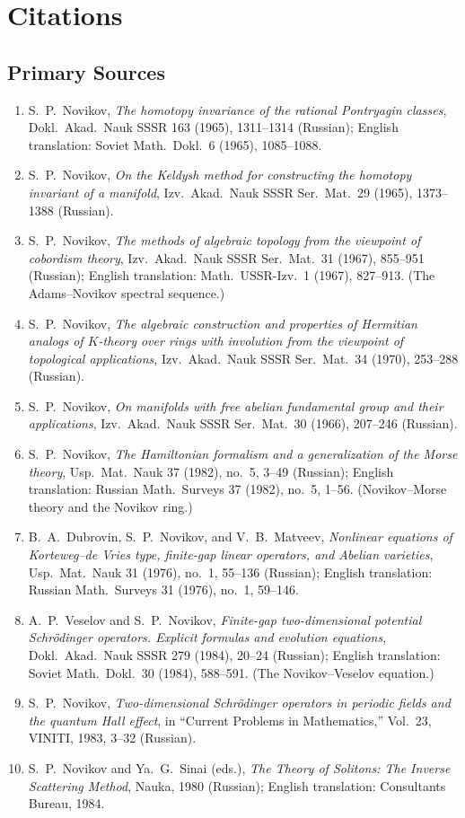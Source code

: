 \section{Citations}\subsection*{Primary Sources}
\begin{enumerate}
    \item S.\ P.\ Novikov, \textit{The homotopy invariance of the rational Pontryagin classes}, Dokl.\ Akad.\ Nauk SSSR 163 (1965), 1311--1314 (Russian); English translation: Soviet Math.\ Dokl.\ 6 (1965), 1085--1088.
    \item S.\ P.\ Novikov, \textit{On the Keldysh method for constructing the homotopy invariant of a manifold}, Izv.\ Akad.\ Nauk SSSR Ser.\ Mat.\ 29 (1965), 1373--1388 (Russian).
    \item S.\ P.\ Novikov, \textit{The methods of algebraic topology from the viewpoint of cobordism theory}, Izv.\ Akad.\ Nauk SSSR Ser.\ Mat.\ 31 (1967), 855--951 (Russian); English translation: Math.\ USSR-Izv.\ 1 (1967), 827--913. (The Adams--Novikov spectral sequence.)
    \item S.\ P.\ Novikov, \textit{The algebraic construction and properties of Hermitian analogs of \(K\)-theory over rings with involution from the viewpoint of topological applications}, Izv.\ Akad.\ Nauk SSSR Ser.\ Mat.\ 34 (1970), 253--288 (Russian).
    \item S.\ P.\ Novikov, \textit{On manifolds with free abelian fundamental group and their applications}, Izv.\ Akad.\ Nauk SSSR Ser.\ Mat.\ 30 (1966), 207--246 (Russian).
    \item S.\ P.\ Novikov, \textit{The Hamiltonian formalism and a generalization of the Morse theory}, Usp.\ Mat.\ Nauk 37 (1982), no.\ 5, 3--49 (Russian); English translation: Russian Math.\ Surveys 37 (1982), no.\ 5, 1--56. (Novikov--Morse theory and the Novikov ring.)
    \item B.\ A.\ Dubrovin, S.\ P.\ Novikov, and V.\ B.\ Matveev, \textit{Nonlinear equations of Korteweg--de Vries type, finite-gap linear operators, and Abelian varieties}, Usp.\ Mat.\ Nauk 31 (1976), no.\ 1, 55--136 (Russian); English translation: Russian Math.\ Surveys 31 (1976), no.\ 1, 59--146.
    \item A.\ P.\ Veselov and S.\ P.\ Novikov, \textit{Finite-gap two-dimensional potential Schr\"odinger operators. Explicit formulas and evolution equations}, Dokl.\ Akad.\ Nauk SSSR 279 (1984), 20--24 (Russian); English translation: Soviet Math.\ Dokl.\ 30 (1984), 588--591. (The Novikov--Veselov equation.)
    \item S.\ P.\ Novikov, \textit{Two-dimensional Schr\"odinger operators in periodic fields and the quantum Hall effect}, in ``Current Problems in Mathematics,'' Vol.\ 23, VINITI, 1983, 3--32 (Russian).
    \item S.\ P.\ Novikov and Ya.\ G.\ Sinai (eds.), \textit{The Theory of Solitons: The Inverse Scattering Method}, Nauka, 1980 (Russian); English translation: Consultants Bureau, 1984.
\end{enumerate}

